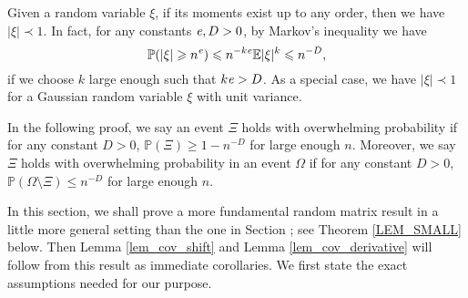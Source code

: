 \begin{example}\label{example stoc}
Given a random variable $\xi$, if its moments exist up to any order, then we have $|\xi|\prec 1$. In fact, for any constants ${\mathit{e}}, D>0$, by Markov's inequality we have 
$$ \mathbb{P}(|\xi|\geqslant n^{{\mathit{e}}})\leqslant n^{-k{\mathit{e}}}{\mathbb{E} |\xi|^k}\leqslant n^{-D},$$
if we choose $k$ large enough such that $k{\mathit{e}}>D$. As a special case, we have $|\xi|\prec 1$ for a Gaussian random variable $\xi$ with unit variance.
\end{example}

In the following proof, we say an event $\Xi$ holds with overwhelming probability if for any constant $D>0$, $\mathbb P(\Xi)\ge 1- n^{-D}$ for large enough $n$. Moreover, we say $\Xi$ holds with overwhelming probability in an event $\Omega$ if for any constant $D>0$, $\mathbb P(\Omega\setminus \Xi)\le n^{-D}$ for large enough $n$.

In this section, we shall prove a more fundamental random matrix result in a little more general setting than the one in Section ; see Theorem \ref{LEM_SMALL} below. %
 Then Lemma \ref{lem_cov_shift} and Lemma \ref{lem_cov_derivative} will follow from this result as immediate corollaries. We first state the exact assumptions needed for our purpose.

